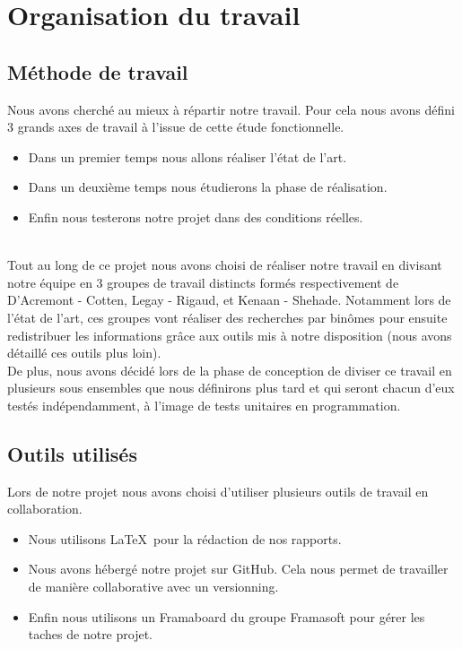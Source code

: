 
\chapter{Organisation du travail}


\section{Méthode de travail}

Nous avons cherché au mieux à répartir notre travail. Pour cela nous avons défini 3 grands axes de travail à l'issue de cette étude fonctionnelle.
\begin{itemize}
\item Dans un premier temps nous allons réaliser l'état de l'art.
\item Dans un deuxième temps nous étudierons la phase de réalisation.
\item Enfin nous testerons notre projet dans des conditions réelles.
\end{itemize}
~\\

Tout au long de ce projet nous avons choisi de réaliser notre travail en divisant notre équipe en 3 groupes de travail distincts formés respectivement de D'Acremont - Cotten, Legay - Rigaud, et Kenaan - Shehade. Notamment lors de l'état de l'art, ces groupes vont réaliser des recherches par binômes pour ensuite redistribuer les informations grâce aux outils mis à notre disposition (nous avons détaillé ces outils plus loin).
~\\

De plus, nous avons décidé lors de la phase de conception de diviser ce travail en plusieurs sous ensembles que nous définirons plus tard et qui seront chacun d'eux testés indépendamment, à l'image de tests unitaires en programmation.



\section{Outils utilisés}

Lors de notre projet nous avons choisi d'utiliser plusieurs outils de travail en collaboration.

\begin{itemize}
\item Nous utilisons \LaTeX~pour la rédaction de nos rapports.
\item Nous avons hébergé notre projet sur GitHub. Cela nous permet de travailler de manière collaborative avec un versionning.
\item Enfin nous utilisons un Framaboard du groupe Framasoft pour gérer les taches de notre projet.
\end{itemize}


